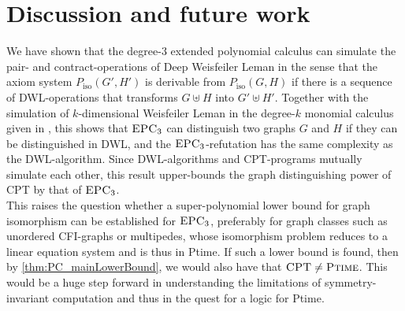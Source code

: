 \documentclass[a4paper,UKenglish,cleveref, autoref, thm-restate]{lipics-v2021}
\newcommand{\CPT}{\mbox{\sc CPT}}
\newcommand{\EPC}{\mbox{\sc EPC}}
\newcommand{\ptime}{\mbox{\sc Ptime}}
\newcommand{\Piso}{P_{\text{iso}}}
\begin{document}
	
	
	
	
	
	
	\section{Discussion and future work}
	We have shown that the degree-$3$ extended polynomial calculus can simulate the pair- and contract-operations of Deep Weisfeiler Leman in the sense that the axiom system $\Piso(G',H')$ is derivable from $\Piso(G,H)$ if there is a sequence of DWL-operations that transforms $G \uplus H$ into $G' \uplus H'$. Together with the simulation of $k$-dimensional Weisfeiler Leman in the degree-$k$ monomial calculus given in \cite{berkholz}, this shows that $\EPC_3$ can distinguish two graphs $G$ and $H$ if they can be distinguished in DWL, and the $\EPC_3$-refutation has the same complexity as the DWL-algorithm. Since DWL-algorithms and CPT-programs mutually simulate each other, this result upper-bounds the graph distinguishing power of CPT by that of $\EPC_3$.\\
	
	This raises the question whether a super-polynomial lower bound for graph isomorphism can be established for $\EPC_3$, preferably for graph classes such as unordered CFI-graphs or multipedes, whose isomorphism problem reduces to a linear equation system and is thus in \ptime. If such a lower bound is found, then by \autoref{thm:PC_mainLowerBound}, we would also have that $\CPT \neq \ptime$. This would be a huge step forward in understanding the limitations of symmetry-invariant computation and thus in the quest for a logic for \ptime.\\
	
\end{document}

